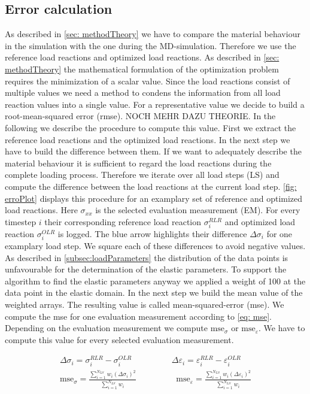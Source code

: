     \subsection{Error calculation}\label{subsec: errorCalculation}
    As described in \autoref{sec: methodTheory} we have to compare the material behaviour in the  simulation with the one during the MD-simulation. Therefore we use the reference load reactions and optimized load reactions. As described in \autoref{sec: methodTheory} the mathematical formulation of the optimization problem requires the minimization of a scalar value. Since the load reactions consist of multiple values we need a method to condens the information from all load reaction values into a single value.  For a representative value we decide to build a root-mean-squared error (rmse). NOCH MEHR DAZU THEORIE. In the following we describe the procedure to compute this value.
    First we extract the reference load reactions and the optimized load reactions. In the next step we have to build the difference between them.  If we want to adequately describe the material behaviour it is sufficient to regard the load reactions during the complete loading process. Therefore we iterate over all load steps (LS) and compute the difference between the load reactions at the current load step. \autoref{fig: erroPlot} displays this procedure for an examplary set of reference and optimized load reactions. Here $\sigma_{xx}$ is the selected evaluation measurement (EM). For every timestep $i$ their corresponding reference load reaction $\sigma_{i}^{\scriptscriptstyle RLR}$ and optimized load reaction $\sigma_{i}^{\scriptscriptstyle OLR}$ is logged. The blue arrow highlights their difference $\Delta\sigma_{i}$ for one examplary load step. We square each of these differences to avoid negative values.  As described in \autoref{subsec:loadParameters} the distribution of the data points is unfavourable for the determination of the elastic parameters. To support the algorithm to find the elastic parameters anyway we applied a weight of 100 at the data point in the elastic domain. In the next step we build the mean value of the weighted arrays. The resulting value is called mean-squared-error (mse). We compute the mse for one evaluation measurement according to \autoref{eq: mse}. Depending on the evaluation measurement we compute $\text{mse}_{\sigma}$ or $\text{mse}_{\varepsilon}$. We have to compute this value for every selected evaluation measurement. 

    \begin{gather}
        \Delta\sigma_{i} = \sigma_{i}^{\scriptscriptstyle RLR} - \sigma_{i}^{\scriptscriptstyle OLR} \hspace{2cm}
        \Delta\varepsilon_{i} = \varepsilon_{i}^{\scriptscriptstyle RLR} - \varepsilon_{i}^{\scriptscriptstyle OLR}\\
        \label{eq: mse}
        \text{mse}_{\sigma} = \frac{\displaystyle\sum_{i=1}^{N_{LS}} w_i (\Delta\sigma_{i})^2}{\displaystyle\sum_{i=1}^{N_{LS}}w_i } \hspace{2cm}
        \text{mse}_{\varepsilon} = \frac{\displaystyle\sum_{i=1}^{N_{LS}} w_i (\Delta\varepsilon_{i})^2}{\displaystyle\sum_{i=1}^{N_{LS}}w_i }
    \end{gather}
    
